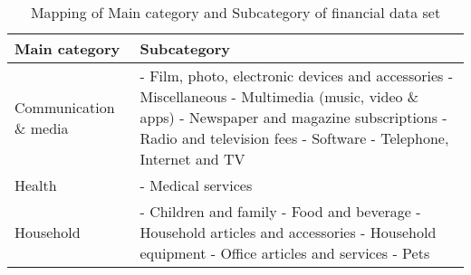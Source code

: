 \begin{table}[t]
	\begin{center}
		\begin{tabular}{ | p{6cm} | p{8cm} | } 
			\hline
			\textbf{Main category} & \textbf{Subcategory} \\
			\hline
			Communication \& media &
			- Film, photo, electronic devices and accessories \newline
			- Miscellaneous \newline
			- Multimedia (music, video \& apps) \newline
			- Newspaper and magazine subscriptions \newline
			- Radio and television fees \newline
			- Software \newline
			- Telephone,  Internet and TV \\
			\hline
			Health &
			- Medical services \\
			\hline
			Household &
			- Children and family \newline
			- Food and beverage \newline
			- Household articles and accessories \newline
			- Household equipment \newline
			- Office articles and services \newline
			- Pets \\
			\hline
			\hline
			\hline
			\hline
		\end{tabular}
		\caption{Mapping of Main category and Subcategory of financial data set}
		\label{tbl:financialcategories}
	\end{center}
\end{table}

